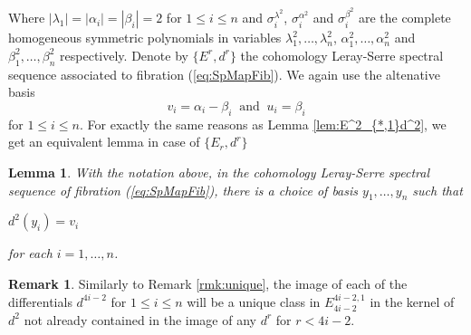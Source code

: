 \documentclass{article}
\theoremstyle{plain}
\newtheorem{lem}[thm]{Lemma}
\theoremstyle{definition}
\newtheorem{rmk}[thm]{Remark}
\numberwithin{thm}{section}
\begin{document}
		Where $|\lambda_1|=|\alpha_i|=|\beta_i|=2$ for $1\leq i \leq n$ and ${\sigma^{\lambda^2}_i}$, ${\sigma^{\alpha^2}_i}$ and ${\sigma^{\beta^2}_i}$
		are the complete homogeneous symmetric polynomials in variables
		$\lambda_1^2,\dots,\lambda_n^2$, $\alpha_1^2,\dots,\alpha_n^2$ and $\beta_1^2,\dots,\beta_n^2$ respectively.
		Denote by $\{ E^r,d^r \}$ the cohomology Leray-Serre spectral sequence associated to fibration (\ref{eq:SpMapFib}).
		We again use the altenative basis
		\begin{equation*}
			v_i=\alpha_i-\beta_i\;\; \text{and} \;\; u_i=\beta_i
		\end{equation*}
		for $1\leq i\leq n$.
		For exactly the same reasons as Lemma \ref{lem:E^2_{*,1}d^2}, we get an equivalent lemma in case of $\{ E_r,d^r \}$
		
		\begin{lem}\label{lem:SpE^2_{*,1}d^2}
			With the notation above, in the cohomology Leray-Serre spectral sequence of fibration (\ref{eq:SpMapFib}),
			there is a choice of basis $y_1,\dots,y_n$ such that
			\begin{center}
				$d^2(y_i)=v_i$
			\end{center}
			for each $i=1,\dots,n$.
		\end{lem}
		
		\begin{rmk}\label{rmk:Spunique}
			Similarly to Remark \ref{rmk:unique}, 
			the image of each of the differentials $d^{4i-2}$ for $1\leq i \leq n$ will be a unique class in $E_{4i-2}^{4i-2,1}$
			in the kernel of $d^2$ not already contained in the image of any $d^r$ for $r<4i-2$.
		\end{rmk}
		
\end{document}
